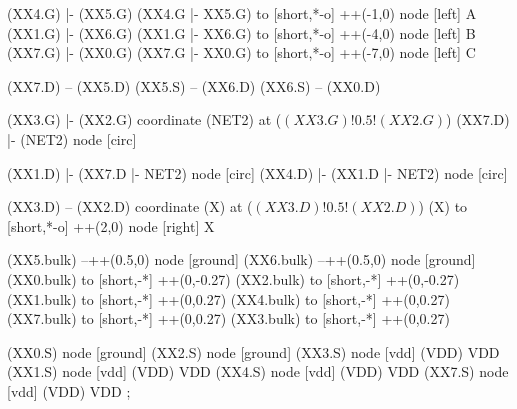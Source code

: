 \begin{circuitikz}[american]

	(XX4.G) |- (XX5.G)
	(XX4.G |- XX5.G) to [short,*-o] ++(-1,0) node [left] {A}
	(XX1.G) |- (XX6.G)
	(XX1.G |- XX6.G) to [short,*-o] ++(-4,0) node [left] {B}
	(XX7.G) |- (XX0.G)
	(XX7.G |- XX0.G) to [short,*-o] ++(-7,0) node [left] {C}
	
	(XX7.D) -- (XX5.D)
	(XX5.S) -- (XX6.D)
	(XX6.S) -- (XX0.D)
	
	(XX3.G) |- (XX2.G)
	coordinate (NET2) at ($(XX3.G)!0.5!(XX2.G)$) 
	(XX7.D) |- (NET2) node [circ]{}
	
	(XX1.D) |- (XX7.D |- NET2) node [circ]{}
	(XX4.D) |- (XX1.D |- NET2) node [circ]{}  
	
	(XX3.D) -- (XX2.D) 
	coordinate (X) at ($(XX3.D)!0.5!(XX2.D)$)
	(X) to [short,*-o] ++(2,0) node [right] {X}
	
	(XX5.bulk) --++(0.5,0) node [ground]{}	
	(XX6.bulk) --++(0.5,0) node [ground]{}
	(XX0.bulk) to [short,-*] ++(0,-0.27)
	(XX2.bulk) to [short,-*] ++(0,-0.27)
	(XX1.bulk) to [short,-*] ++(0,0.27)
	(XX4.bulk) to [short,-*] ++(0,0.27)
	(XX7.bulk) to [short,-*] ++(0,0.27)
	(XX3.bulk) to [short,-*] ++(0,0.27)


	(XX0.S) node [ground] {}
	(XX2.S) node [ground] {}
	(XX3.S) node [vdd] (VDD) {VDD}
	(XX1.S) node [vdd] (VDD) {VDD}
	(XX4.S) node [vdd] (VDD) {VDD}
	(XX7.S) node [vdd] (VDD) {VDD}
;

\end{circuitikz}
